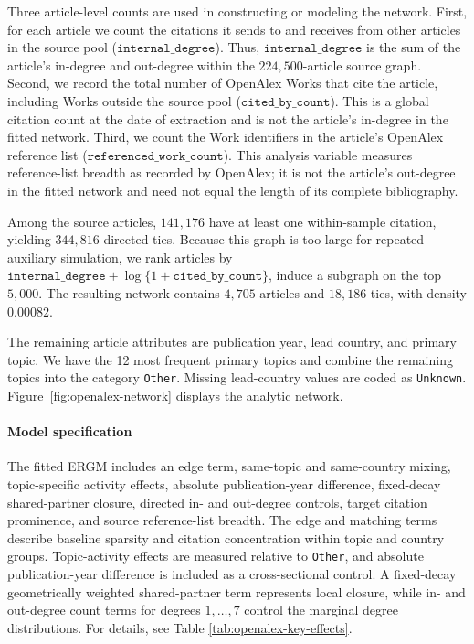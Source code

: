 \documentclass[preprint,12pt,authoryear]{elsarticle}
\begin{document}
Three article-level counts are used in constructing or modeling the network.
First, for each article we count the citations it sends to and receives from
other articles in the source pool (\(\texttt{internal\_degree}\)). Thus,
\(\texttt{internal\_degree}\) is the sum of the article's in-degree and
out-degree within the \(224{,}500\)-article source graph. Second, we record the
total number of OpenAlex Works that cite the article, including Works outside
the source pool (\(\texttt{cited\_by\_count}\)). This is a global citation
count at the date of extraction and is not the article's in-degree in the
fitted network. Third, we count the Work identifiers in the article's OpenAlex
reference list (\(\texttt{referenced\_work\_count}\)). This analysis variable
measures reference-list breadth as recorded by OpenAlex; it is not the
article's out-degree in the fitted network and need not equal the length of its
complete bibliography.

Among the source articles, \(141{,}176\) have at least one within-sample
citation, yielding \(344{,}816\) directed ties. Because this graph is too large
for repeated auxiliary simulation, we rank articles by
\(\texttt{internal\_degree}+\log\{1+\texttt{cited\_by\_count}\}\), induce a
subgraph on the top \(5{,}000\). The resulting network contains \(4{,}705\) articles and \(18{,}186\)
ties, with density \(0.00082\).

The remaining article attributes are publication year, lead country, and
primary topic. We have the 12 most frequent primary topics and combine the
remaining topics into the category \texttt{Other}. Missing lead-country values
are coded as \texttt{Unknown}. Figure~\ref{fig:openalex-network} displays the
analytic network.



\paragraph{Model specification}
The fitted ERGM includes an edge term, same-topic and same-country mixing,
topic-specific activity effects, absolute publication-year difference,
fixed-decay shared-partner closure, directed in- and out-degree controls,
target citation prominence, and source reference-list breadth. The edge and
matching terms describe baseline sparsity and citation concentration within
topic and country groups. Topic-activity effects are measured relative to
\texttt{Other}, and absolute publication-year difference is included as a
cross-sectional control. A fixed-decay geometrically weighted shared-partner
term represents local closure, while in- and out-degree count terms for degrees
\(1,\ldots,7\) control the marginal degree distributions. For details, see Table \ref{tab:openalex-key-effects}.
\end{document}
